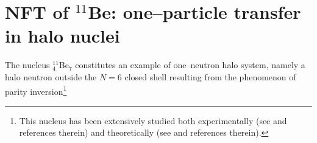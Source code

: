  
 
 
 
 
 
 
\section{NFT of $^{11}$Be: one--particle transfer in halo nuclei}\label{C6S2}
 The nucleus $^{11}_4$Be$_7$ constitutes an example of one--neutron halo system, namely a halo neutron outside the $N=6$ closed shell resulting from the phenomenon of parity inversion\footnote{This nucleus has been extensively studied both experimentally (see \cite{Iwasaki:00,Fortier:99,Winfield:01,Auton:70,Zwieglinski:79,Schmitt:13,Nortershauser:09,Kwan:14}  and references therein) and theoretically (see \cite{Talmi:60,Otsuka:93,Sagawa:93,Vinh:95,Gori:04,Nunes:96,Fossez:16,Hamamoto:07,Kanada:02,Calci:16,Krieger:12,Timofeyuk:99,Keeley:04,Deltuva:09,Deltuva:13,Lay:14,deDiego:14} and references therein).}
 
